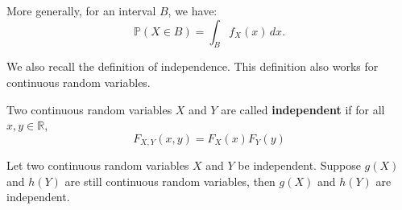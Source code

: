 \documentclass{huhtakm-template-book}
\newcommand{\prob}{\mathbb{P}}
\begin{document}
	\begin{rem}
		More generally, for an interval $B$, we have:
		\begin{equation*}
			\prob(X\in B)=\int_{B}f_{X}(x)\,dx.
		\end{equation*}
	\end{rem}

    \newpage
    We also recall the definition of independence. This definition also works for continuous random variables.
    \begin{defn}
        Two continuous random variables $X$ and $Y$ are called \textbf{independent} if for all $x,y\in\mathbb{R}$,
        \begin{equation*}
            F_{X,Y}(x,y)=F_{X}(x)F_{Y}(y)
        \end{equation*}
    \end{defn}
    \begin{thm}
        Let two continuous random variables $X$ and $Y$ be independent. Suppose $g(X)$ and $h(Y)$ are still continuous random variables, then $g(X)$ and $h(Y)$ are independent.
    \end{thm}
\end{document}
